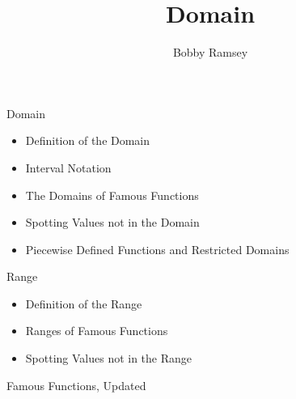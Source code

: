\documentclass{ximera}
\author{Bobby Ramsey}
\title{Domain}
\begin{document}
\begin{abstract}
\end{abstract}
\maketitle


\begin{objectives}

\item Domain
\begin{itemize}
	\item Definition of the Domain
	\item Interval Notation 
	\item The Domains of Famous Functions 
	\item Spotting Values not in the Domain
	\item Piecewise Defined Functions and Restricted Domains 
\end{itemize}

\item Range
\begin{itemize}
	\item Definition of the Range
	\item Ranges of Famous Functions 
	\item Spotting Values not in the Range
\end{itemize}

\item Famous Functions, Updated



\end{objectives}
\end{document}
